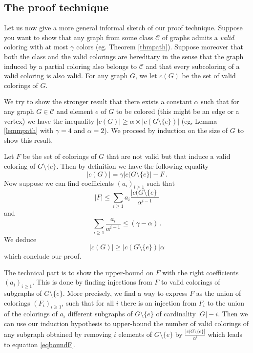 \documentclass[a4paper,10pt]{article}
\begin{document}
\subsection{The proof technique}
Let us now give a more general informal sketch of our proof technique. 
Suppose you want to show that any graph from some class $\mathcal{C}$ of graphs admits a \emph{valid} coloring with at most $\gamma$ colors (eg. Theorem \ref{thmpath}).
Suppose moreover that both the class and the valid colorings are hereditary in the sense that the graph induced by a partial coloring also belongs to $\mathcal{C}$ and that every subcoloring of a valid coloring is also valid.
For any graph $G$, we let $c(G)$ be the set of valid colorings of $G$.

We try to show the stronger result that there exists a constant $\alpha$ such that for any graph $G\in\mathcal{C}$ and element $e$ of $G$ to be colored (this might be an edge or a vertex) we have the inequality
$|c(G)|\ge\alpha\times |c(G\setminus\{e\})|$ (eg, Lemma \ref{lemmpath} with $\gamma=4$ and $\alpha=2$).
We proceed by induction on the size of $G$ to show this result.

Let $F$ be the set of colorings of $G$ that are not valid but that induce
a valid coloring of $G\setminus\{e\}$. Then by definition we have the following equality $$|c(G)|= \gamma |c(G\setminus\{e\}| - F\,.$$ 
Now suppose we can find coefficients $(a_i)_{i\ge1}$ such that \begin{equation}\label{eqboundF}
|F|\le \sum_{i\ge1}a_i \frac{ |c(G\setminus\{e\}|}{\alpha^{i-1}}
\end{equation}
and
 \begin{equation}\label{eqgammaalpha}
\sum_{i\ge1}\frac{a_i}{\alpha^{i-1}}\le(\gamma-\alpha)\,.
 \end{equation}
We deduce
$$|c(G)|\ge |c(G\setminus\{e\})| \alpha$$ which conclude our proof.

The technical part is to show the upper-bound on $F$ with the right coefficients $(a_i)_{i\ge1}$. 
This is done by finding injections from $F$ to valid colorings of subgraphs of $G\setminus\{e\}$. More precisely, we find a way to express $F$ as the union of colorings $(F_i)_{i\ge1}$, 
such that for all $i$ there is an injection from $F_i$ to the union of the colorings of $a_i$ different subgraphs of $G\setminus\{e\}$ of cardinality $|G|-i$. Then we can use our induction hypothesis to upper-bound the number of valid colorings of any subgraph obtained by removing $i$ elements of $G\setminus\{e\}$ by $\frac{ |c(G\setminus\{e\}|}{\alpha^{i}}$ which leads to equation \eqref{eqboundF}.
\end{document}
